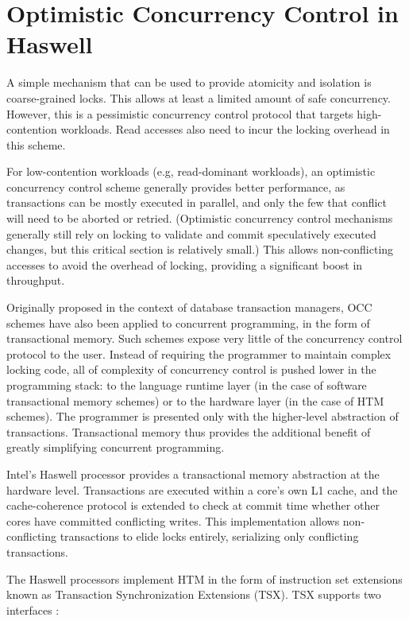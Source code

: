 \section{Optimistic Concurrency Control in Haswell} \label{sec:tm}

A simple mechanism that can be used to provide atomicity and isolation is
coarse-grained locks. This allows at least a limited amount of safe concurrency.
However, this is a pessimistic concurrency control protocol that targets
high-contention workloads. Read accesses also need to incur the locking overhead
in this scheme.

For low-contention workloads (e.g, read-dominant workloads), an optimistic
concurrency control scheme generally provides better performance, as
transactions can be mostly executed in parallel, and only the few that conflict
will need to be aborted or retried. (Optimistic concurrency control mechanisms
generally still rely on locking to validate and commit speculatively executed
changes, but this critical section is relatively small.) This allows
non-conflicting accesses to avoid the overhead of locking, providing a
significant boost in throughput.

Originally proposed in the context of database transaction managers, OCC schemes
have also been applied to concurrent programming, in the form of transactional
memory. Such schemes expose very little of the concurrency control protocol to
the user. Instead of requiring the programmer to maintain complex locking code,
all of complexity of concurrency control is pushed lower in the programming
stack: to the language runtime layer (in the case of software transactional
memory schemes) or to the hardware layer (in the case of HTM schemes). The
programmer is presented only with the higher-level abstraction of
transactions. Transactional memory thus provides the additional benefit of
greatly simplifying concurrent programming.

Intel's Haswell processor provides a transactional memory abstraction at the
hardware level. Transactions are executed within a core's own L1 cache, and the
cache-coherence protocol is extended to check at commit time whether other cores
have committed conflicting writes. This implementation allows non-conflicting
transactions to elide locks entirely, serializing only conflicting transactions.

The Haswell processors implement HTM in the form of instruction set extensions
known as Transaction Synchronization Extensions (TSX). TSX supports two
interfaces \citep{tsx-intro}: \\


